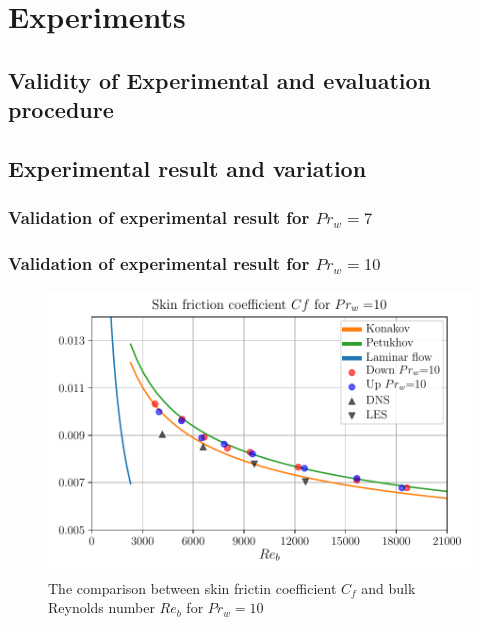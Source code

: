 \documentclass[12pt,oneside]{jbook}
\begin{document}
\chapter{Experiments}
\section{Validity of Experimental and evaluation procedure}
\section{Experimental result and variation}
\subsection{Validation of experimental result for $Pr_{w}=7$}
\subsection{Validation of experimental result for $Pr_{w}=10$}


\begin{figure}[ht]
	\vspace{0zh}
	\begin{center}
		\includegraphics[width=0.9\linewidth]{fig/pr10_recf.pdf}
		\vspace{-1zh}
		\caption{The comparison between skin frictin coefficient $C_{f}$ and bulk Reynolds number $Re_{b}$ for $Pr_{w} = 10$}
		\label{pr}
	\end{center}
	\vspace{0zh}
\end{figure}
\end{document}
